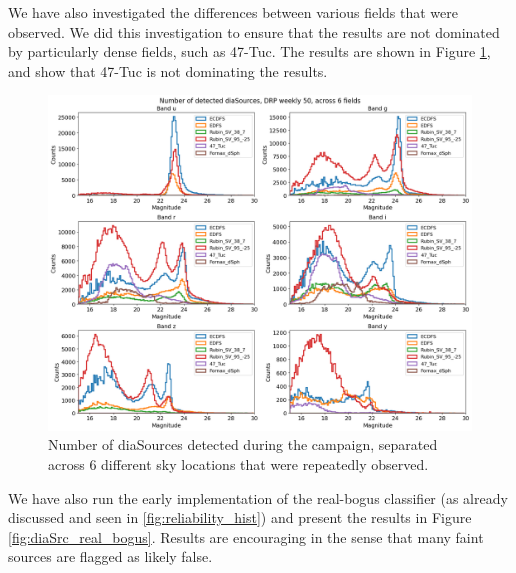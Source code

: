 We have also investigated the differences between various fields that were observed. We did this investigation to ensure that the results are not dominated by particularly dense fields, such as 47-Tuc. The results are shown in Figure \ref{fig:diaSrc_fields}, and show that 47-Tuc is not dominating the results.

\begin{figure}
  \includegraphics[width=\textwidth]{dia/figures/diaSources_50_6_fields.png}
  \caption{Number of diaSources detected during the campaign, separated across 6 different sky locations that were repeatedly observed.}
  \label{fig:diaSrc_fields}
\end{figure}

We have also run the early implementation of the real-bogus classifier (as already discussed and seen in \ref{fig:reliability_hist}) and present the results in Figure \ref{fig:diaSrc_real_bogus}. Results are encouraging in the sense that many faint sources are flagged as likely false.

